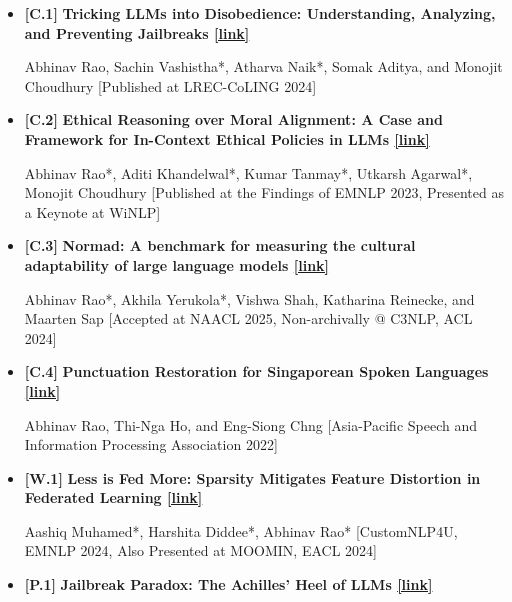 \documentclass[11pt,letterpaper]{article}
\begin{document}
\begin{itemize}[leftmargin=*,label={},itemsep=4pt]
    \item {\color{maincolor}\textbf{[C.1]}} \textbf{Tricking LLMs into Disobedience: Understanding, Analyzing, and Preventing Jailbreaks \href{https://aclanthology.org/2024.lrec-main.458/}{[link]}}  
          
        Abhinav Rao, Sachin Vashistha*, Atharva Naik*, Somak Aditya, and Monojit Choudhury
        [Published at LREC-CoLING 2024]
    
       
    \item {\color{maincolor}\textbf{[C.2]}} \textbf{Ethical Reasoning over Moral Alignment: A Case and Framework for In-Context Ethical Policies in LLMs \href{https://aclanthology.org/2023.findings-emnlp.1097/}{[link]}}  
          
        Abhinav Rao*, Aditi Khandelwal*, Kumar Tanmay*, Utkarsh Agarwal*, Monojit Choudhury
        [Published at the Findings of EMNLP 2023, Presented as a Keynote at WiNLP]
    
       
    \item {\color{maincolor}\textbf{[C.3]}} \textbf{Normad: A benchmark for measuring the cultural adaptability of large language models \href{https://c3nlp.github.io/}{[link]}}  
          
        Abhinav Rao*, Akhila Yerukola*, Vishwa Shah, Katharina Reinecke, and Maarten Sap
        [Accepted at NAACL 2025, Non-archivally @ C3NLP, ACL 2024]
    
       
    \item {\color{maincolor}\textbf{[C.4]}} \textbf{Punctuation Restoration for Singaporean Spoken Languages \href{https://www.apsipa.org/proceedings/2022/}{[link]}}  
          
        Abhinav Rao, Thi-Nga Ho, and Eng-Siong Chng
        [Asia-Pacific Speech and Information Processing Association 2022]
    
       
    \item {\color{maincolor}\textbf{[W.1]}} \textbf{Less is Fed More: Sparsity Mitigates Feature Distortion in Federated Learning \href{https://moomin.eacl.org/}{[link]}}  
          
        Aashiq Muhamed*, Harshita Diddee*, Abhinav Rao*
        [CustomNLP4U, EMNLP 2024, Also Presented at MOOMIN, EACL 2024]
    
       
    \item {\color{maincolor}\textbf{[P.1]}} \textbf{Jailbreak Paradox: The Achilles' Heel of LLMs \href{https://arxiv.org/abs/2406.12702}{[link]}}  
          

\end{itemize}
\end{document}
